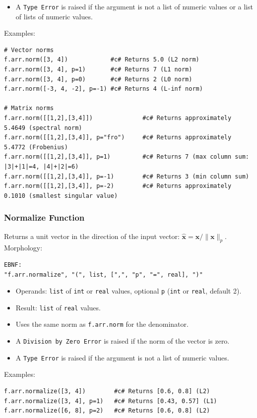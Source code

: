 \begin{itemize}
\item A \texttt{Type Error} is raised if the argument is not a list of numeric values or a list of lists of numeric values.
\end{itemize}
Examples:
\begin{verbatim}
# Vector norms
f.arr.norm([3, 4])            #c# Returns 5.0 (L2 norm)
f.arr.norm([3, 4], p=1)       #c# Returns 7 (L1 norm)
f.arr.norm([3, 4], p=0)       #c# Returns 2 (L0 norm)
f.arr.norm([-3, 4, -2], p=-1) #c# Returns 4 (L-inf norm)

# Matrix norms
f.arr.norm([[1,2],[3,4]])              #c# Returns approximately 5.4649 (spectral norm)
f.arr.norm([[1,2],[3,4]], p="fro")     #c# Returns approximately 5.4772 (Frobenius)
f.arr.norm([[1,2],[3,4]], p=1)         #c# Returns 7 (max column sum: |3|+|1|=4, |4|+|2|=6)
f.arr.norm([[1,2],[3,4]], p=-1)        #c# Returns 3 (min column sum)
f.arr.norm([[1,2],[3,4]], p=-2)        #c# Returns approximately 0.1010 (smallest singular value)
\end{verbatim}

\subsubsection{Normalize Function}
Returns a unit vector in the direction of the input vector: $\hat{\mathbf{x}} = \mathbf{x} / \|\mathbf{x}\|_p$. \\
Morphology:
\begin{verbatim}
EBNF:
"f.arr.normalize", "(", list, [",", "p", "=", real], ")"
\end{verbatim}
\begin{itemize}
\item Operands: \texttt{list} of \texttt{int} or \texttt{real} values, optional \texttt{p} (\texttt{int} or \texttt{real}, default 2).
\item Result: \texttt{list} of \texttt{real} values.
\item Uses the same norm as \texttt{f.arr.norm} for the denominator.
\item A \texttt{Division by Zero Error} is raised if the norm of the vector is zero.
\item A \texttt{Type Error} is raised if the argument is not a list of numeric values.
\end{itemize}
Examples:
\begin{verbatim}
f.arr.normalize([3, 4])        #c# Returns [0.6, 0.8] (L2)
f.arr.normalize([3, 4], p=1)   #c# Returns [0.43, 0.57] (L1)
f.arr.normalize([6, 8], p=2)   #c# Returns [0.6, 0.8] (L2)
\end{verbatim}

